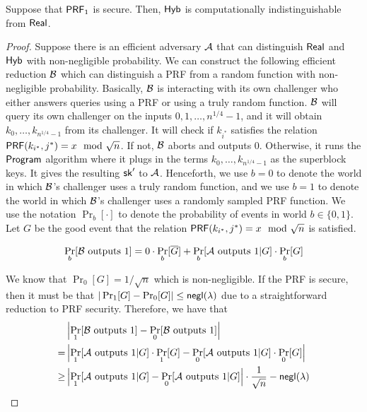 \begin{lemma}
Suppose that $\mathsf{PRF}_1$ is secure. 
Then, ${\sf Hyb}$ 
is computationally indistinguishable from ${\sf Real}$.
\label{lem:privateprog1}
\end{lemma}
\begin{proof}
Suppose there is an efficient adversary $\mathcal{A}$ that can distinguish
${\sf Real}$ and ${\sf Hyb}$ with non-negligible probability. 
We can construct the following efficient reduction 
$\mathcal{B}$
which can distinguish a PRF from a random function 
with non-negligible probability. 
Basically, $\mathcal{B}$ 
is interacting with its own challenger
who either answers queries using a PRF or using a truly random function.
$\mathcal{B}$
will query its own challenger on the inputs 
$0, 1, \ldots, n^{1/4}-1$, 
and it will obtain 
$k_0, \ldots, k_{n^{1/4} - 1}$ from 
its challenger.
It will check if $k_{i^*}$
satisfies the relation 
$\mathsf{PRF}(k_{i^*}, j^*) = x \mod \sqrt{n}$. 
If not, $\mathcal{B}$ aborts and outputs $0$. 
Otherwise, it runs the ${\sf Program}$ algorithm where it plugs in 
the terms $k_0, \ldots, k_{n^{1/4} - 1}$  
as the superblock keys.
It gives the resulting $\mathsf{sk}'$
to $\mathcal{A}$. 
Henceforth, we use $b = 0$ to denote the world  
in which $\mathcal{B}$'s  challenger 
uses 
a truly random function, and we use $b = 1$ to denote
the world in which $\mathcal{B}$'s challenger uses a randomly sampled PRF function.
We use the notation $\Pr_b[\cdot]$
to denote the probability of events in world $b \in \{0, 1\}$. 
Let $G$ be the good event that 
the relation 
$\mathsf{PRF}(k_{i^*}, j^*) = x \mod \sqrt{n}$
is satisfied.

\[
\Pr_b[\mathcal{B} \text{ outputs } 1]
= 
0 \cdot \Pr_b [\overline{G}]
+ \Pr_b[ \mathcal{A} \text{ outputs } 1 | G] \cdot \Pr_b[G]
\]

We know that $\Pr_0[G] = 1/\sqrt{n}$ which is non-negligible.
If the PRF is secure, then 
it must be that $|\Pr_1[G] - \Pr_0[G]| \leq \mathsf{negl}(\lambda)$
due to a straightforward reduction to PRF security.
Therefore, we have that 
\begin{align*}
 & \left|\Pr_1[\mathcal{B} \text{ outputs } 1]
- \Pr_0[\mathcal{B} \text{ outputs } 1]\right|\\
 = & 
\left| \Pr_1[ \mathcal{A} \text{ outputs } 1 | G] \cdot \Pr_1[G]
- 
\Pr_0[ \mathcal{A} \text{ outputs } 1 | G] \cdot \Pr_0[G]
\right|\\
\geq & 
\left|\Pr_1[ \mathcal{A} \text{ outputs } 1 | G] 
- 
\Pr_0[ \mathcal{A} \text{ outputs } 1 | G] \right|\cdot \frac{1}{\sqrt{n}}
- \mathsf{negl}(\lambda)
\end{align*}


\end{proof}
